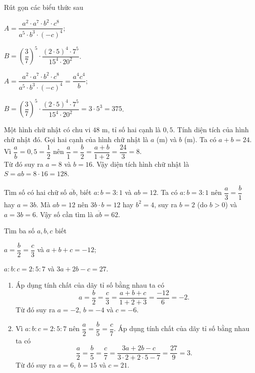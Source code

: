 \begin{vn}
Rút gọn các biểu thức sau
\begin{listEX}[2]
\item $A=\dfrac{a^2\cdot a^7\cdot b^2\cdot c^8}{a^5\cdot b^3\cdot (-c)^4}$;
\item $B=\left(\dfrac{3}{7}\right)^5\cdot \dfrac{(2\cdot 5)^4\cdot 7^5}{15^4\cdot 20^2}$.
\end{listEX}
\loigiai
{
\begin{listEX}[2]
\item $A=\dfrac{a^2\cdot a^7\cdot b^2\cdot c^8}{a^5\cdot b^3\cdot (-c)^4}=\dfrac{a^4c^4}{b}$;
\item $B=\left(\dfrac{3}{7}\right)^5\cdot \dfrac{(2\cdot 5)^4\cdot 7^5}{15^4\cdot 20^2}=3\cdot 5^3=375$.
\end{listEX}
}
\end{vn}
\begin{vn}
Một hình chữ nhật có chu vi $48$ m, tỉ số hai cạnh là $0,5$. Tính diện tích của hình chữ nhật đó.
\loigiai
{
Gọi hai cạnh của hình chữ nhật là $a$ (m) và $b$ (m). Ta có $a+b=24$.\\
Vì $\dfrac{a}{b}=0,5=\dfrac{1}{2}$ nên $\dfrac{a}{1}=\dfrac{b}{2}=\dfrac{a+b}{1+2}=\dfrac{24}{3}=8$.\\
Từ đó suy ra $a=8$ và $b=16$. Vậy diện tích hình chữ nhật là $S=ab=8\cdot 16=128$.
}
\end{vn}
\begin{vn}
Tìm số có hai chữ số $\overline{ab}$, biết $a:b=3:1$ và $ab=12$.
\loigiai
{
Ta có $a:b=3:1$ nên $\dfrac{a}{3}=\dfrac{b}{1}$ hay $a=3b$. Mà $ab=12$ nên $3b\cdot b=12$ hay $b^2=4$, suy ra $b=2$ (do $b>0$) và $a=3b=6$. Vậy số cần tìm là  $\overline{ab}=62$.
}
\end{vn}
\begin{vn}
Tìm ba số $a,b,c$ biết 
\begin{listEX}[2]
\item $a=\dfrac{b}{2}=\dfrac{c}{3}$ và $a+b+c=-12$;
\item $a:b:c=2:5:7$ và $3a+2b-c=27$.
\end{listEX}
\loigiai
{
\begin{enumerate}
\item Áp dụng tính chất của dãy tỉ số bằng nhau ta có
\[ a=\dfrac{b}{2}=\dfrac{c}{3}=\dfrac{a+b+c}{1+2+3}=\dfrac{-12}{6}=-2. \]
Từ đó suy ra $a=-2$, $b=-4$ và $c=-6$.
\item  Vì $a:b:c=2:5:7$ nên $\dfrac{a}{2}=\dfrac{b}{5}=\dfrac{c}{7}$. Áp dụng tính chất của dãy tỉ số bằng nhau ta có
\[\dfrac{a}{2}=\dfrac{b}{5}=\dfrac{c}{7}=\dfrac{3a+2b-c}{3\cdot 2+2\cdot 5-7}=\dfrac{27}{9}=3.\]
Từ đó suy ra $a=6$, $b=15$ và $c=21$.
\end{enumerate}
}
\end{vn}
